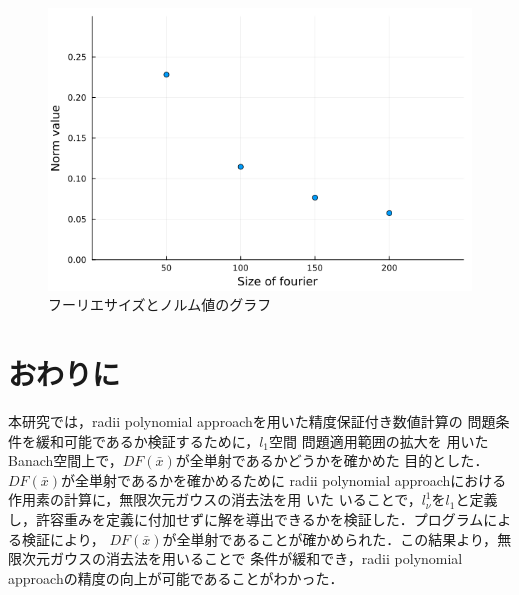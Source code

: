 \documentclass[11pt,a4paper,titlepage]{jsreport}
\theoremstyle{definition}
\newcommand{\rad}{radii polynomial approach}
\providecommand{\DIFadd}[1]{{\protect\color{blue} \sf #1}} %
\providecommand{\DIFdel}[1]{{\protect\color{red} \scriptsize #1}} %
\providecommand{\DIFaddbegin}{} %
\providecommand{\DIFaddend}{} %
\providecommand{\DIFdelbegin}{} %
\providecommand{\DIFdelend}{} %
\providecommand{\DIFaddFL}[1]{\DIFadd{#1}} %
\newcommand{\DIFscaledelfig}{0.5}
\newlength{\DIFdelgraphicswidth} %
\newlength{\DIFdelgraphicsheight} %
\newcommand{\DIFaddincludegraphics}[2][]{{\color{blue}\fbox{\DIFOincludegraphics[#1]{#2}}}} %
\newcommand{\DIFdelincludegraphics}[2][]{%
\sbox{\DIFdelgraphicsbox}{\DIFOincludegraphics[#1]{#2}}%
\settoboxwidth{\DIFdelgraphicswidth}{\DIFdelgraphicsbox} %
\settoboxtotalheight{\DIFdelgraphicsheight}{\DIFdelgraphicsbox} %
\scalebox{\DIFscaledelfig}{%
\parbox[b]{\DIFdelgraphicswidth}{\usebox{\DIFdelgraphicsbox}\\[-\baselineskip] \rule{\DIFdelgraphicswidth}{0em}}\llap{\resizebox{\DIFdelgraphicswidth}{\DIFdelgraphicsheight}{%
\setlength{\unitlength}{\DIFdelgraphicswidth}%
\begin{picture}(1,1)%
\thicklines\linethickness{2pt} %
{\color[rgb]{1,0,0}\put(0,0){\framebox(1,1){}}}%
{\color[rgb]{1,0,0}\put(0,0){\line( 1,1){1}}}%
{\color[rgb]{1,0,0}\put(0,1){\line(1,-1){1}}}%
\end{picture}%
}\hspace*{3pt}}} %
} %
\DeclareRobustCommand{\DIFaddbegin}{\DIFOaddbegin \let\includegraphics\DIFaddincludegraphics} %
\DeclareRobustCommand{\DIFaddend}{\DIFOaddend \let\includegraphics\DIFOincludegraphics} %
\DeclareRobustCommand{\DIFdelbegin}{\DIFOdelbegin \let\includegraphics\DIFdelincludegraphics} %
\DeclareRobustCommand{\DIFdelend}{\DIFOaddend \let\includegraphics\DIFOincludegraphics} %
\begin{document}
\DIFdelbegin %
\DIFdelend \DIFaddbegin \begin{figure}[htbp]
  \centering
  \includegraphics[scale=0.5]{img/scatter.png}
  \caption{\DIFaddFL{フーリエサイズとノルム値のグラフ}}
  \label{fig:norm-gra}
\end{figure}
 \DIFaddend \newpage 
 \newpage 
\chapter{おわりに}

本研究では，\rad{}を用いた精度保証付き数値計算の\DIFdelbegin \DIFdel{問題条件を緩和可能であるか検証するために，$l_1$空間}\DIFdelend \DIFaddbegin \DIFadd{問題適用範囲の拡大}\DIFaddend を\DIFdelbegin \DIFdel{用いたBanach空間上で，$DF(\bar{x})$が全単射であるかどうかを確かめた}\DIFdelend \DIFaddbegin \DIFadd{目的とした}\DIFaddend ．\DIFdelbegin \DIFdel{$DF(\bar{x})$が全単射であるかを確かめるために}\DIFdelend \DIFaddbegin \DIFadd{\rad{}における作用素の計算に}\DIFaddend ，無限次元ガウスの消去法を用\DIFdelbegin \DIFdel{いた}\DIFdelend \DIFaddbegin \DIFadd{いることで，$l_\nu^1$を$l_1$と定義し，許容重みを定義に付加せずに解を導出できるかを検証した}\DIFaddend ．プログラムによる検証により，\DIFdelbegin \DIFdel{$DF(\bar{x})$が全単射であることが確かめられた．この結果より，}\DIFdelend 無限次元ガウスの消去法を用いることで\DIFdelbegin \DIFdel{条件が緩和でき，}\DIFdelend \rad{}の精度の向上が可能であることがわかった．
\end{document}

